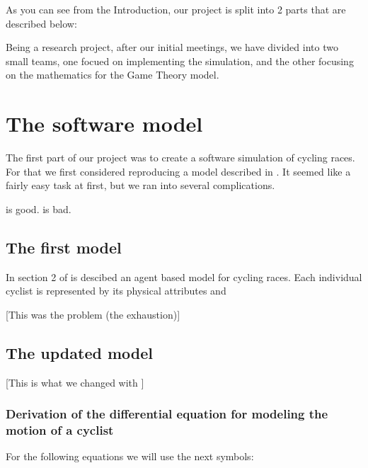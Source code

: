 \documentclass[10pt, a4paper]{report}
\begin{document}
As you can see from the Introduction, our project is split into 2 parts that are described below:

Being a research project, after our initial meetings, we have divided into two small teams, one focued on implementing the simulation, and the other focusing on the mathematics for the Game Theory model.



\section{The software model}

The first part of our project was to create a software simulation of cycling races. For that we first considered reproducing a model described in \cite{AgentModel}. It seemed like a fairly easy task at first, but we ran into several complications.

\cite{MathModel} is good.
\cite{GameTheoryApplications} is bad.

\subsection{The first model}

In section 2 of \cite{AgentModel} is descibed an agent based model for cycling races. Each individual cyclist is represented by its physical attributes and 

[This was the problem (the exhaustion)]

\subsection{The updated model}

[This is what we changed with \cite{MathModel}]

\subsubsection{Derivation of the differential equation for modeling the motion of a cyclist}

For the following equations we will use the next symbols: \\
\end{document}
